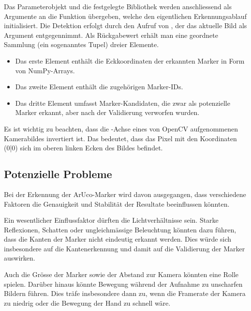 Das Parameterobjekt und die festgelegte Bibliothek werden anschliessend als Argumente an die Funktion  übergeben, welche den eigentlichen Erkennungsablauf initialisiert.
Die Detektion erfolgt durch den Aufruf von , der das aktuelle Bild als Argument entgegennimmt.
Als Rückgabewert erhält man eine geordnete Sammlung (ein sogenanntes Tupel) dreier Elemente.

\begin{itemize}
    \item Das erste Element enthält die Eckkoordinaten der erkannten Marker in Form von NumPy-Arrays.
    \item Das zweite Element enthält die zugehörigen Marker-IDs.
    \item Das dritte Element umfasst Marker-Kandidaten\footnotemark{}, die zwar als potenzielle Marker erkannt, aber nach der Validierung verworfen wurden.
\end{itemize}

Es ist wichtig zu beachten, dass die -Achse eines von OpenCV aufgenommenen Kamerabildes invertiert ist.
Das bedeutet, dass das Pixel mit den Koordinaten (0|0) sich im oberen linken Ecken des Bildes befindet.


\subsection{Potenzielle Probleme}
Bei der Erkennung der ArUco-Marker wird davon ausgegangen, dass verschiedene Faktoren die Genauigkeit und Stabilität der Resultate beeinflussen könnten.

Ein wesentlicher Einflussfaktor dürften die Lichtverhältnisse sein.
Starke Reflexionen, Schatten oder ungleichmässige Beleuchtung könnten dazu führen, dass die Kanten der Marker nicht eindeutig erkannt werden.
Dies würde sich insbesondere auf die Kantenerkennung und damit auf die Validierung der Marker auswirken.

Auch die Grösse der Marker sowie der Abstand zur Kamera könnten eine Rolle spielen.
Darüber hinaus könnte Bewegung während der Aufnahme zu unscharfen Bildern führen.
Dies träfe insbesondere dann zu, wenn die Framerate der Kamera zu niedrig oder die Bewegung der Hand zu schnell wäre.

